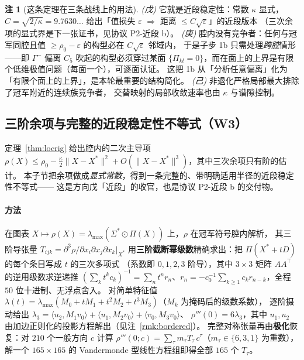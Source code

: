 \documentclass[UTF8,11pt]{ctexart}
\theoremstyle{definition}
\newtheorem{remark}[theorem]{注}
\begin{document}
\begin{remark}[这条定理在三条战线上的用法]
\emph{(戊)} 它就是近段稳定性：常数 $\kappa$ 显式，$C=\sqrt{2/\kappa}=9.7630\ldots$
给出「值损失 $\varepsilon$ $\Rightarrow$ 距离 $\le C\sqrt\varepsilon$」的近段版本
（三次余项的显式界是下一张证书，见协议 P2-近段 b）。
\emph{(庚)} 腔内没有竞争者：任何与冠军同腔且值 $\ge\rho_0-\varepsilon$ 的构型必在 $C\sqrt\varepsilon$ 邻域内，
于是子步 1b 只需处理\emph{跨腔}情形——即 $\Gamma^-$ 偏离 $C_5$ 吹起的构型必须穿过某面
$\{\Pi_{kl}=0\}$，而在面上的上界是有限个低维极值问题（每面一个），可逐面认证。
这把 1b 从「分析任意偏离」化为「有限个面上的上界」，是本轮最重要的结构简化。
\emph{(己)} 非退化严格局部最大排除了冠军附近的连续族竞争者，
交替映射的局部收敛速率也由 $\kappa$ 与谱隙控制。
\end{remark}

\subsection{三阶余项与完整的近段稳定性不等式（W3）}\label{sec:w3}

定理~\ref{thm:locrig} 给出腔内的二次主导项
$\rho(X)\le\rho_0-\frac\kappa2\|X-X^*\|^2+O(\|X-X^*\|^3)$，其中三次余项只有阶的估计。
本子节把余项做成\emph{显式常数}，得到一条完整的、带明确适用半径的近段稳定性不等式——
这是方向戊「近段」的收官，也是协议 P2-近段 b 的交付物。

\paragraph{方法}
在图表 $X\mapsto\rho(X)=\lambda_{\max}(\Sigma^*\odot\Pi(X))$ 上，$\rho$ 在冠军符号腔内解析，
其三阶导张量 $T_{ijk}=\partial^3\rho/\partial x_i\partial x_j\partial x_k\big|_{X^*}$
用\textbf{三阶截断幂级数}精确求出：把 $\Pi(X^*+tD)$ 的每个条目写成 $t$ 的三次多项式
（系数即 $0,1,2,3$ 阶导），其中 $3\times3$ 矩阵 $AA^\top$ 的逆用级数求逆递推
$(\sum_k t^kc_k)^{-1}=\sum_n t^nr_n$、$r_n=-c_0^{-1}\sum_{k\ge1}c_kr_{n-k}$，全程 $50$ 位十进制、无浮点舍入。
对简单特征值 $\lambda(t)=\lambda_{\max}(M_0+tM_1+t^2M_2+t^3M_3)$（$M_k$ 为掩码后的级数系数），
逐阶摄动给出 $\lambda_3=\langle u_2,M_1v_0\rangle+\langle u_1,M_2v_0\rangle+\langle v_0,M_3v_0\rangle$、
$\rho'''(0)=6\lambda_3$，其中 $u_1,u_2$ 由加边正则化的投影方程解出（见注~\ref{rmk:bordered}）。
完整对称张量再由\textbf{极化}恢复：对 $210$ 个一般方向 $c$ 计算
$\rho'''(0;c)=\sum_\tau m_\tau T_\tau\,c^\tau$（$m_\tau\in\{6,3,1\}$ 为重数），
解一个 $165\times165$ 的 Vandermonde 型线性方程组即得全部 $165$ 个 $T_\tau$。
\end{document}
